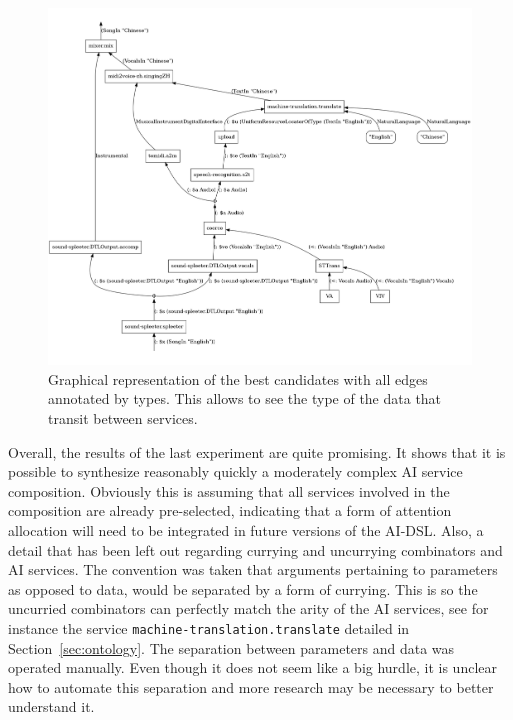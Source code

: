 \documentclass[]{report}
\begin{document}
\begin{figure}[H]
  \centering
  \includegraphics[scale=0.215]{figs/cnd-3-typed.png}
  \caption{Graphical representation of the best candidates with all
    edges annotated by types.  This allows to see the type of the data
    that transit between services.}
  \label{fig:cnd3typed}
\end{figure}
Overall, the results of the last experiment are quite promising.  It
shows that it is possible to synthesize reasonably quickly a
moderately complex AI service composition.  Obviously this is assuming
that all services involved in the composition are already
pre-selected, indicating that a form of attention allocation will need
to be integrated in future versions of the AI-DSL.  Also, a detail
that has been left out regarding currying and uncurrying combinators
and AI services.  The convention was taken that arguments pertaining
to parameters as opposed to data, would be separated by a form of
currying.  This is so the uncurried combinators can perfectly match
the arity of the AI services, see for instance the service
\texttt{machine-translation.translate} detailed in
Section~\ref{sec:ontology}.  The separation between parameters and
data was operated manually.  Even though it does not seem like a big
hurdle, it is unclear how to automate this separation and more
research may be necessary to better understand it.
\end{document}
